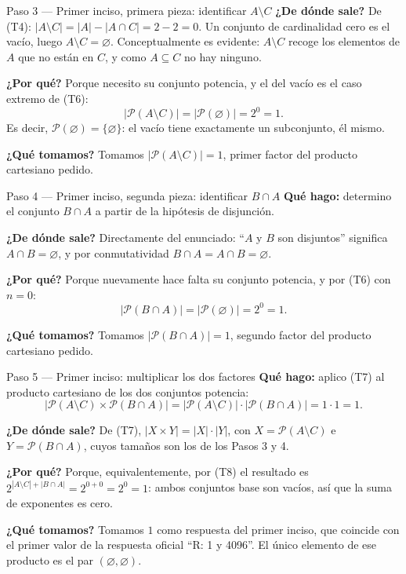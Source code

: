 \documentclass[11pt]{article}
\begin{document}
\begin{sol}
\begin{paso}{Paso 3 --- Primer inciso, primera pieza: identificar $A\setminus C$}
\textbf{¿De dónde sale?} De (T4): $|A\setminus C| = |A| - |A\cap C| = 2 - 2 = 0$. Un conjunto de cardinalidad cero es el vacío, luego $A\setminus C = \varnothing$. Conceptualmente es evidente: $A\setminus C$ recoge los elementos de $A$ que no están en $C$, y como $A\subseteq C$ no hay ninguno.

\textbf{¿Por qué?} Porque necesito su conjunto potencia, y el del vacío es el caso extremo de (T6):
\[
|\mathcal{P}(A\setminus C)| = |\mathcal{P}(\varnothing)| = 2^{0} = 1 .
\]
Es decir, $\mathcal{P}(\varnothing) = \{\varnothing\}$: el vacío tiene exactamente un subconjunto, él mismo.

\textbf{¿Qué tomamos?} Tomamos $|\mathcal{P}(A\setminus C)| = 1$, primer factor del producto cartesiano pedido.
\end{paso}

\begin{paso}{Paso 4 --- Primer inciso, segunda pieza: identificar $B\cap A$}
\textbf{Qué hago:} determino el conjunto $B\cap A$ a partir de la hipótesis de disjunción.

\textbf{¿De dónde sale?} Directamente del enunciado: ``$A$ y $B$ son disjuntos'' significa $A\cap B = \varnothing$, y por conmutatividad $B\cap A = A\cap B = \varnothing$.

\textbf{¿Por qué?} Porque nuevamente hace falta su conjunto potencia, y por (T6) con $n = 0$:
\[
|\mathcal{P}(B\cap A)| = |\mathcal{P}(\varnothing)| = 2^{0} = 1 .
\]

\textbf{¿Qué tomamos?} Tomamos $|\mathcal{P}(B\cap A)| = 1$, segundo factor del producto cartesiano pedido.
\end{paso}

\begin{paso}{Paso 5 --- Primer inciso: multiplicar los dos factores}
\textbf{Qué hago:} aplico (T7) al producto cartesiano de los dos conjuntos potencia:
\[
|\mathcal{P}(A\setminus C)\times \mathcal{P}(B\cap A)|
= |\mathcal{P}(A\setminus C)|\cdot|\mathcal{P}(B\cap A)|
= 1\cdot 1 = 1 .
\]

\textbf{¿De dónde sale?} De (T7), $|X\times Y| = |X|\cdot|Y|$, con $X = \mathcal{P}(A\setminus C)$ e $Y = \mathcal{P}(B\cap A)$, cuyos tamaños son los de los Pasos 3 y 4.

\textbf{¿Por qué?} Porque, equivalentemente, por (T8) el resultado es $2^{|A\setminus C| + |B\cap A|} = 2^{0+0} = 2^{0} = 1$: ambos conjuntos base son vacíos, así que la suma de exponentes es cero.

\textbf{¿Qué tomamos?} Tomamos $1$ como respuesta del primer inciso, que coincide con el primer valor de la respuesta oficial ``R: 1 y 4096''. El único elemento de ese producto es el par $(\varnothing,\varnothing)$.
\end{paso}


\end{sol}
\end{document}
